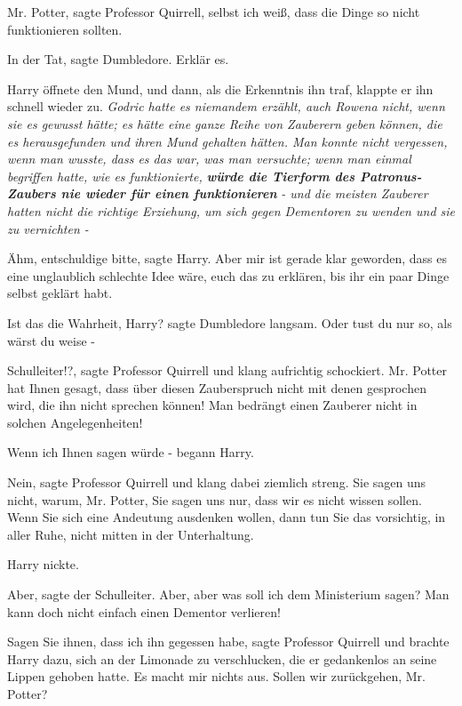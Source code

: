 \glqq{}Mr. Potter\grqq{}, sagte Professor Quirrell, \glqq{}selbst ich weiß, dass
die Dinge so nicht funktionieren sollten.\grqq{}

\glqq{}In der Tat\grqq{}, sagte Dumbledore. \glqq{}Erklär es.\grqq{}

Harry öffnete den Mund, und dann, als die Erkenntnis ihn traf, klappte er ihn
schnell wieder zu. \emph{ Godric hatte es niemandem erzählt, auch Rowena nicht,
wenn sie es gewusst hätte; es hätte eine ganze Reihe von Zauberern geben können,
die es herausgefunden und ihren Mund gehalten hätten. Man konnte nicht
vergessen, wenn man wusste, dass es das war, was man versuchte; wenn man einmal
begriffen hatte, wie es funktionierte,} \textbf{\emph{würde die Tierform des
Patronus-Zaubers nie wieder für einen funktionieren} }\emph{- und die meisten
Zauberer hatten nicht die richtige Erziehung, um sich gegen Dementoren zu wenden
und sie zu vernichten -}

\glqq{}Ähm, entschuldige bitte\grqq{}, sagte Harry. \glqq{}Aber mir ist gerade
klar geworden, dass es eine unglaublich schlechte Idee wäre, euch das zu
erklären, bis ihr ein paar Dinge selbst geklärt habt.\grqq{}

\glqq{}Ist das die Wahrheit, Harry?\grqq{} sagte Dumbledore langsam. \glqq{}Oder
tust du nur so, als wärst du weise -\grqq{}

\glqq{}Schulleiter!?\grqq{}, sagte Professor Quirrell und klang aufrichtig
schockiert. \glqq{}Mr. Potter hat Ihnen gesagt, dass über diesen Zauberspruch
nicht mit denen gesprochen wird, die ihn nicht sprechen können! Man bedrängt
einen Zauberer nicht in solchen Angelegenheiten!\grqq{}

\glqq{}Wenn ich Ihnen sagen würde -\grqq{} begann Harry.

\glqq{}Nein\grqq{}, sagte Professor Quirrell und klang dabei ziemlich streng.
\glqq{}Sie sagen uns nicht, warum, Mr. Potter, Sie sagen uns nur, dass wir es
nicht wissen sollen. Wenn Sie sich eine Andeutung ausdenken wollen, dann tun Sie
das vorsichtig, in aller Ruhe, nicht mitten in der Unterhaltung.\grqq{}

Harry nickte.

\glqq{}Aber\grqq{}, sagte der Schulleiter. \glqq{}Aber, aber was soll ich dem
Ministerium sagen? Man kann doch nicht einfach einen Dementor verlieren!\grqq{}

\glqq{}Sagen Sie ihnen, dass ich ihn gegessen habe\grqq{}, sagte Professor
Quirrell und brachte Harry dazu, sich an der Limonade zu verschlucken, die er
gedankenlos an seine Lippen gehoben hatte. \glqq{}Es macht mir nichts aus. Sollen
wir zurückgehen, Mr. Potter?\grqq{}

